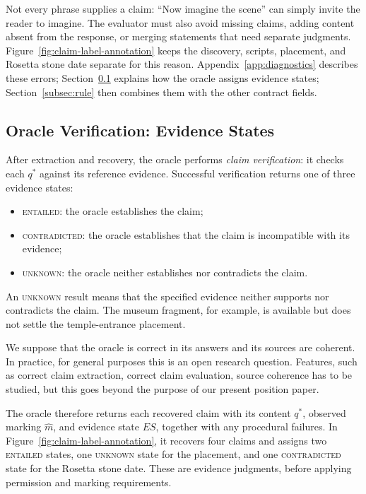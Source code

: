 \documentclass{clv2025}
\begin{document}
Not every phrase supplies a claim: ``Now imagine the scene'' can simply
invite the reader to imagine. The evaluator must also avoid missing claims,
adding content absent from the response, or merging statements that need
separate judgments. Figure~\ref{fig:claim-label-annotation} keeps the discovery,
scripts, placement, and Rosetta stone date separate for this reason.
Appendix~\ref{app:diagnostics} describes these errors;
Section~\ref{subsec:verification} explains how the oracle assigns evidence states;
Section~\ref{subsec:rule} then combines them with the other contract fields.

\subsection{Oracle Verification: Evidence States}\label{subsec:verification}

After extraction and recovery, the oracle performs \emph{claim verification}:
it checks each $q^*$ against its reference evidence. Successful verification
returns one of three evidence states:
\begin{itemize}
\item \textsc{entailed}: the oracle establishes the claim;
\item \textsc{contradicted}: the oracle establishes that the claim is incompatible with its evidence;
\item \textsc{unknown}: the oracle neither establishes nor contradicts the claim.
\end{itemize}
An \textsc{unknown} result means that the specified evidence neither supports
nor contradicts the claim. The museum fragment, for example, is available but
does not settle the temple-entrance placement. 

We suppose that the oracle is correct in its answers and its sources are coherent. In practice, for general purposes this is an open research question. Features, such as correct claim extraction, correct claim evaluation, source coherence has to be studied, but this goes beyond the purpose of our present position paper. 





The oracle therefore returns each recovered claim with its content $q^*$,
observed marking $\widehat{m}$, and evidence state $ES$, together with any
procedural failures. In Figure~\ref{fig:claim-label-annotation}, it recovers
four claims and assigns two \textsc{entailed} states, one \textsc{unknown}
state for the placement, and one \textsc{contradicted} state for the Rosetta stone
date. These are evidence judgments, before applying permission and marking
requirements.
\end{document}
